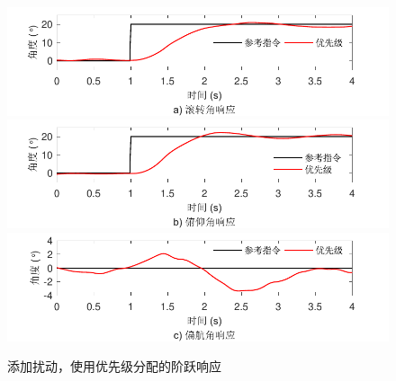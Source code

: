 \begin{figure}[htbp]
	\centering	
	\includegraphics[scale=1]{Fig/Fig13a.pdf}
	\includegraphics[scale=1]{Fig/Fig13b.pdf}
	\includegraphics[scale=1]{Fig/Fig13c.pdf}
	\caption{\label{fig_p_step_with_d}添加扰动，使用优先级分配的阶跃响应}
\end{figure}
